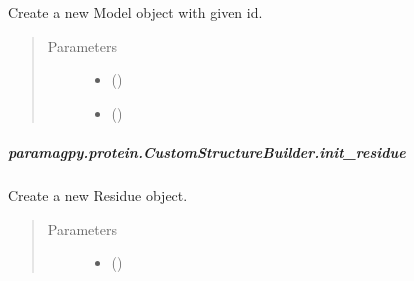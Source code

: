 \documentclass[a4paper,10pt,english]{sphinxmanual}
\begin{document}
\begin{fulllineitems}
\begin{fulllineitems}
\begin{fulllineitems}
\label{\detokenize{reference/generated/paramagpy.protein.CustomStructureBuilder.init_model:paramagpy.protein.CustomStructureBuilder.init_model}}
Create a new Model object with given id.
\begin{quote}\begin{description}
\item[{Parameters}] \leavevmode\begin{itemize}
\item {} 
 (\sphinxstyleliteralemphasis{\sphinxupquote{-}}) \textendash{} 

\item {} 
 (\sphinxstyleliteralemphasis{\sphinxupquote{-}}) \textendash{} 

\end{itemize}

\end{description}\end{quote}

\end{fulllineitems}



\subparagraph{paramagpy.protein.CustomStructureBuilder.init\_residue}
\label{\detokenize{reference/generated/paramagpy.protein.CustomStructureBuilder.init_residue:paramagpy-protein-customstructurebuilder-init-residue}}\label{\detokenize{reference/generated/paramagpy.protein.CustomStructureBuilder.init_residue::doc}}

\begin{fulllineitems}
\label{\detokenize{reference/generated/paramagpy.protein.CustomStructureBuilder.init_residue:paramagpy.protein.CustomStructureBuilder.init_residue}}
Create a new Residue object.
\begin{quote}\begin{description}
\item[{Parameters}] \leavevmode\begin{itemize}
\item {} 
\sphinxstyleliteralstrong{\sphinxupquote{, }} (\sphinxstyleliteralemphasis{\sphinxupquote{-}}) \textendash{} 


\end{itemize}
\end{description}
\end{quote}
\end{fulllineitems}
\end{fulllineitems}
\end{fulllineitems}
\end{document}
